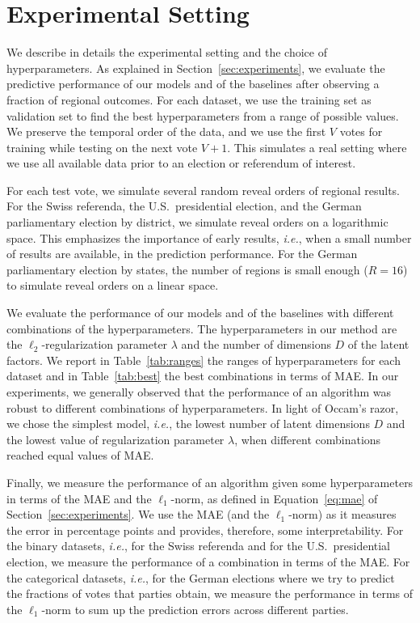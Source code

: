 \section{Experimental Setting}
\label{app:experimental_setting}

We describe in details the experimental setting and the choice of hyperparameters.
As explained in Section~\ref{sec:experiments}, we evaluate the predictive performance of our models and of the baselines after observing a fraction of regional outcomes.
For each dataset, we use the training set as validation set to find the best hyperparameters from a range of possible values.
We preserve the temporal order of the data, and we use the first $V$ votes for training while testing on the next vote $V+1$.
This simulates a real setting where we use all available data prior to an election or referendum of interest.

For each test vote, we simulate several random reveal orders of regional results.
For the Swiss referenda, the U.S.\ presidential election, and the German parliamentary election by district, we simulate reveal orders on a logarithmic space.
This emphasizes the importance of early results, \textit{i.e.}, when a small number of results are available, in the prediction performance.
For the German parliamentary election by states, the number of regions is small enough ($R=16$) to simulate reveal orders on a linear space.

We evaluate the performance of our models and of the baselines with different combinations of the hyperparameters.
The hyperparameters in our method are the $\ell_2$-regularization parameter $\lambda$ and the number of dimensions $D$ of the latent factors.
We report in Table~\ref{tab:ranges} the ranges of hyperparameters for each dataset and in Table~\ref{tab:best} the best combinations in terms of MAE.
In our experiments, we generally observed that the performance of an algorithm was robust to different combinations of hyperparameters.
In light of Occam's razor, we chose the simplest model, \textit{i.e.}, the lowest number of latent dimensions $D$ and the lowest value of regularization parameter $\lambda$, when different combinations reached equal values of MAE.

Finally, we measure the performance of an algorithm given some hyperparameters in terms of the MAE and the $\ell_1$-norm, as defined in Equation~\eqref{eq:mae} of Section~\ref{sec:experiments}.
We use the MAE (and the $\ell_1$-norm) as it measures the error in percentage points and provides, therefore, some interpretability.
For the binary datasets, \textit{i.e.}, for the Swiss referenda and for the U.S.\ presidential election, we measure the performance of a combination in terms of the MAE.
For the categorical datasets, \textit{i.e.}, for the German elections where we try to predict the fractions of votes that parties obtain, we measure the performance in terms of the $\ell_1$-norm to sum up the prediction errors across different parties.

